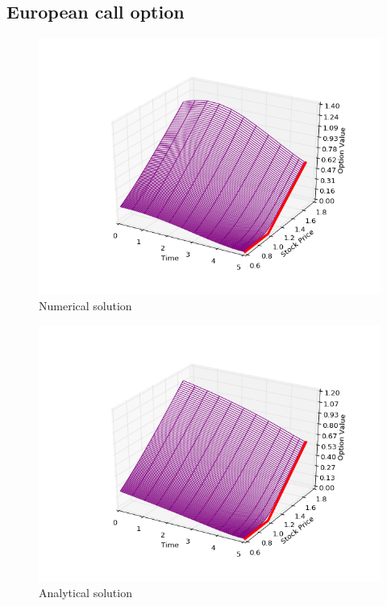 \documentclass[11pt,a4paper]{extarticle}
\begin{document}
\subsection{European call option}

			\begin{minipage}{\linewidth}
      \centering
      \begin{minipage}{0.3\linewidth}
          \begin{figure}[H]
              \includegraphics[width=\linewidth]{Figures/eu-call-num}
              \caption{Numerical solution}
          \end{figure}
      \end{minipage}
      \hspace{0.05\linewidth}
      \begin{minipage}{0.3\linewidth}
          \begin{figure}[H]
              \includegraphics[width=\linewidth]{Figures/eu-call-analyt}
              \caption{Analytical solution}
          \end{figure}
      \end{minipage}
  \end{minipage}
\end{document}
